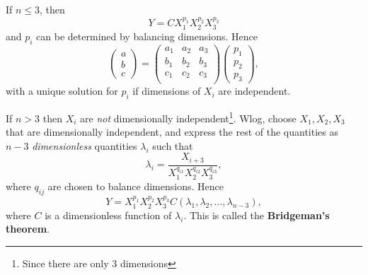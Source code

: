 If $n\le 3$, then 
\[
    Y = C X_1^{p_1}X_2^{p_2}X_3^{p_3}
\]
and $p_i$ can be determined by balancing dimensions. Hence
\[
    \begin{pmatrix}
        a \\ b \\ c
    \end{pmatrix}=\begin{pmatrix}
        a_1 & a_2 & a_3 \\
        b_1 & b_2 & b_3 \\
        c_1 & c_2 & c_3 \\
    \end{pmatrix}\begin{pmatrix}
        p_1 \\ p_2 \\ p_3
    \end{pmatrix},
\]
with a unique solution for $p_i$ if dimensions of $X_i$ are independent.

If $n>3$ then $X_i$ are \textit{not} dimensionally independent\footnote{Since there are only 3 dimensions}. Wlog, choose $X_1,X_2,X_3$ that are dimensionally independent, and express the rest of the quantities as $n-3$ \textit{dimensionless} quantities $ \lambda_i $ such that 
\[
    \lambda_{i} = \frac{X_{i+3}}{X_1^{q_{i1}}X_2^{q_{i2}}X_3^{q_{i3}}},
\]
where $q_{ij}$ are chosen to balance dimensions. Hence 
\[
    Y=X_1^{p_1}X_2^{p_2}X_3^{p_3}C(\lambda_1,\lambda_2,\dots,\lambda_{n-3}),
\]
where $C$ is a dimensionless function of $ \lambda_i $. This is called the \textbf{Bridgeman's theorem}.

